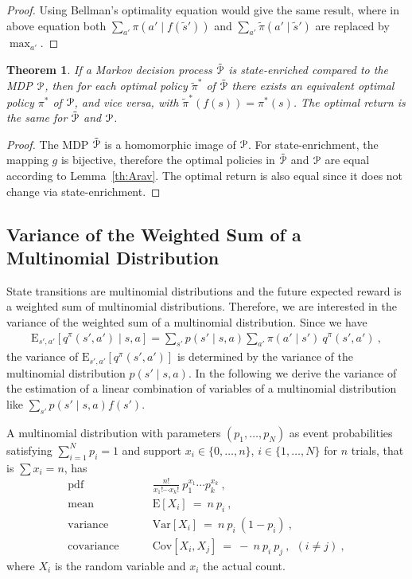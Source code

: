 \documentclass{article}
\newtheorem{theoremA}{Theorem}
\newcommand\EXP{\mathbf{\mathrm{E}}}
\newcommand\VAR{\mathbf{\mathrm{Var}}}
\newcommand\COV{\mathbf{\mathrm{Cov}}}
\begin{document}
\begin{appendices}
\begin{proof}
Using Bellman's optimality equation would give the same result,
where in above equation
both $\sum_{a'} \pi(a'\mid f(\tilde{s}'))$ and $\sum_{a'} \tilde{\pi}(a'\mid \tilde{s}')$ are
replaced by $\max_{a'}$.
\end{proof}


\begin{theoremA}
  If a Markov decision process $\tilde{\mathcal{P}}$ is state-enriched compared to
  the MDP $\mathcal{P}$, then for each optimal policy $\tilde{\pi}^*$ of $\tilde{\mathcal{P}}$ there
  exists an equivalent optimal policy $\pi^*$ of $\mathcal{P}$, and vice
  versa, with $\tilde{\pi}^*(f(s))=\pi^*(s)$. The
  optimal return is the same for $\tilde{\mathcal{P}}$ and $\mathcal{P}$.
\end{theoremA}
\begin{proof}
  The MDP $\tilde{\mathcal{P}}$ is a homomorphic image of $\mathcal{P}$.
  For state-enrichment, the mapping $g$ is bijective, therefore the
  optimal policies in $\tilde{\mathcal{P}}$ and $\mathcal{P}$ are equal according to
  Lemma~\ref{th:Arav}. The optimal return is also equal since it does
  not change via state-enrichment.
\end{proof}


\subsection{Variance of the Weighted Sum of a Multinomial Distribution}

State transitions are multinomial distributions and the future
expected reward is a weighted sum of multinomial distributions.
Therefore, we are interested in the variance of the weighted sum
of a multinomial distribution.
Since we have
\begin{align}
  \EXP_{s',a'} \left[ q^\pi(s',a') \mid s,a \right] =
  \sum_{s'} p(s'\mid s,a) \sum_{a'} \pi(a' \mid s')  \ q^\pi(s',a')
  \ ,
\end{align}
the variance of $\EXP_{s',a'} \left[ q^\pi(s', a')\right]$
is determined by the variance of the multinomial distribution
$p(s'\mid s,a)$. In the following we derive
the variance of the estimation of a
linear combination of variables of a multinomial distribution like
$\sum_{s'} p(s'\mid s,a) f(s')$.


A multinomial distribution with parameters $(p_1, \ldots, p_N)$ as
event probabilities satisfying $\sum_{i=1}^N p_i = 1$
and support $x_i \in \{0, \dots, n\}$, $i \in \{1,\dots,N\}$ for $n$
trials, that is $\sum x_i = n$, has
\begin{align}
  \text{pdf} \ &\text{~~~~~~} \frac{n!}{x_1!\cdots x_k!} \ p_1^{x_1}
  \cdots p_k^{x_k} \ , \\
  \text{mean} \ &\text{~~~~~~} \EXP[X_i] \ = \ n \ p_i \ , \\
  \text{variance} \ &\text{~~~~~~} \VAR[X_i] \ = \ n \ p_i \ (1-p_i) \
  , \\
  \text{covariance} \ &\text{~~~~~~} \COV[X_i,X_j] \ =
  \ - \ n \ p_i\ p_j \ , \ \ (i\neq j) \ ,
\end{align}
where $X_i$ is the random variable and $x_i$ the actual count.


\end{appendices}
\end{document}
